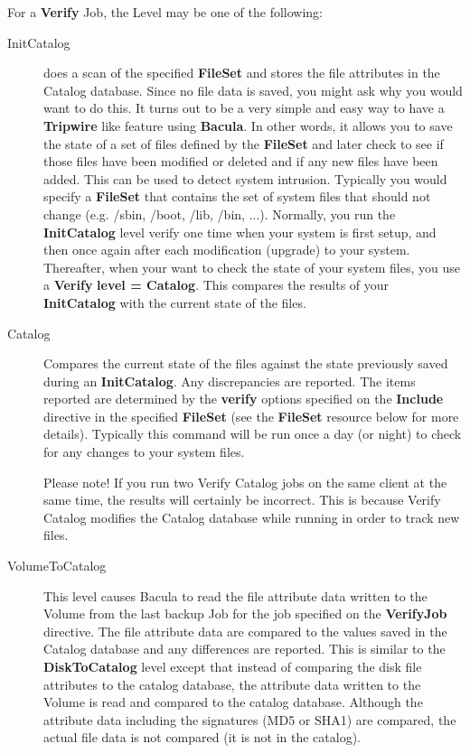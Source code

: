 \begin{description}
For a {\bf Verify} Job, the Level may be one of the  following:  

\begin{description}

\item [InitCatalog]
   does a scan of the specified {\bf FileSet} and stores the file
   attributes in the Catalog database.  Since no file data is saved, you
   might ask why you would want to do this.  It turns out to be a very
   simple and easy way to have a {\bf Tripwire} like feature using {\bf
   Bacula}.  In other words, it allows you to save the state of a set of
   files defined by the {\bf FileSet} and later check to see if those files
   have been modified or deleted and if any new files have been added.
   This can be used to detect system intrusion.  Typically you would
   specify a {\bf FileSet} that contains the set of system files that
   should not change (e.g.  /sbin, /boot, /lib, /bin, ...).  Normally, you
   run the {\bf InitCatalog} level verify one time when your system is
   first setup, and then once again after each modification (upgrade) to
   your system.  Thereafter, when your want to check the state of your
   system files, you use a {\bf Verify} {\bf level = Catalog}.  This
   compares the results of your {\bf InitCatalog} with the current state of
   the files.

\item [Catalog]
   Compares the current state of the files against the state previously
   saved during an {\bf InitCatalog}.  Any discrepancies are reported.  The
   items reported are determined by the {\bf verify} options specified on
   the {\bf Include} directive in the specified {\bf FileSet} (see the {\bf
   FileSet} resource below for more details).  Typically this command will
   be run once a day (or night) to check for any changes to your system
   files.

   Please note!  If you run two Verify Catalog jobs on the same client at
   the same time, the results will certainly be incorrect.  This is because
   Verify Catalog modifies the Catalog database while running in order to
   track new files.

\item [VolumeToCatalog]
   This level causes Bacula to read the file attribute data written to the
   Volume from the last backup Job for the job specified on the {\bf VerifyJob}
   directive.  The file attribute data are compared to the
   values saved in the Catalog database and any differences are reported.
   This is similar to the {\bf DiskToCatalog} level except that instead of
   comparing the disk file attributes to the catalog database, the
   attribute data written to the Volume is read and compared to the catalog
   database.  Although the attribute data including the signatures (MD5 or
   SHA1) are compared, the actual file data is not compared (it is not in
   the catalog).


\end{description}
\end{description}
